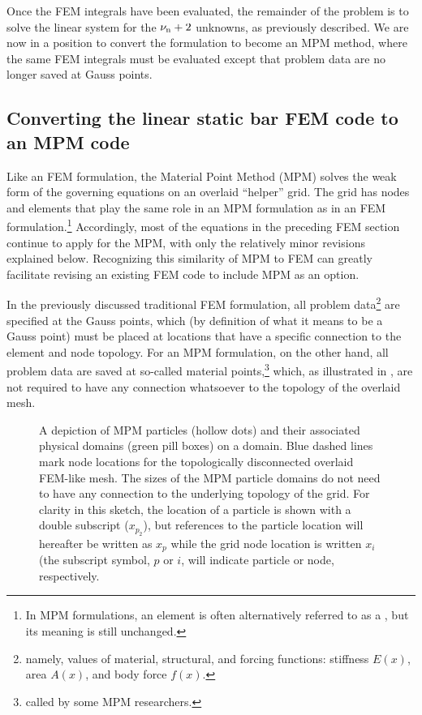 Once the FEM integrals have been evaluated, the remainder of the problem is to solve the linear system for the ${\nu_\text{n}}+2$ unknowns, as previously described. We are now in a position to convert the formulation to become an MPM method, where the same FEM integrals must be evaluated except that problem data are no longer saved at Gauss points.

















\subsection{Converting the \oneD linear static bar FEM code to an MPM code}
Like an FEM formulation, the Material Point Method (MPM) solves the weak form of the governing equations on an overlaid ``helper'' grid. The grid has nodes and elements that play the same role in an MPM formulation as in an FEM formulation.\footnote{In MPM formulations, an element is often alternatively referred to as a , but its meaning is still unchanged.}  Accordingly, most of the equations in the preceding FEM section continue to apply for the MPM, with only the relatively minor revisions explained below. Recognizing this similarity of MPM to FEM can greatly facilitate revising an existing FEM code to include MPM as an option.

In the previously discussed traditional FEM formulation, all problem data\footnote{namely, values of material, structural, and forcing functions: stiffness $E(x)$, area $A(x)$, and body force $f(x)$.} are specified at the Gauss points, which (by definition of what it means to be a Gauss point) must be placed at locations that have a specific connection to the element and node topology. For an MPM formulation, on the other hand, all problem data are saved at so-called material points,\footnote{called  by some MPM researchers.} which, as illustrated in , are not required to have any connection whatsoever to the topology of the overlaid mesh.

%
%
%
\begin{figure}[ht]
\caption{A depiction of MPM particles (hollow dots) and their associated physical domains (green pill boxes) on a \oneD domain. Blue dashed lines mark node locations for the topologically disconnected overlaid FEM-like mesh.  The sizes of the MPM particle domains do not need to have any connection to the underlying topology of the grid.  For clarity in this sketch, the location of a particle is shown with a double subscript (\eg $x_{p_2}$), but references to the \pth particle location will hereafter be written as $x_p$ while the \ith grid node location is written $x_i$ (\ie the subscript symbol, $p$ or $i$, will indicate particle or node, respectively.}
\label{fig:particlesOnOneDgrid}
\end{figure}
%
%
%

